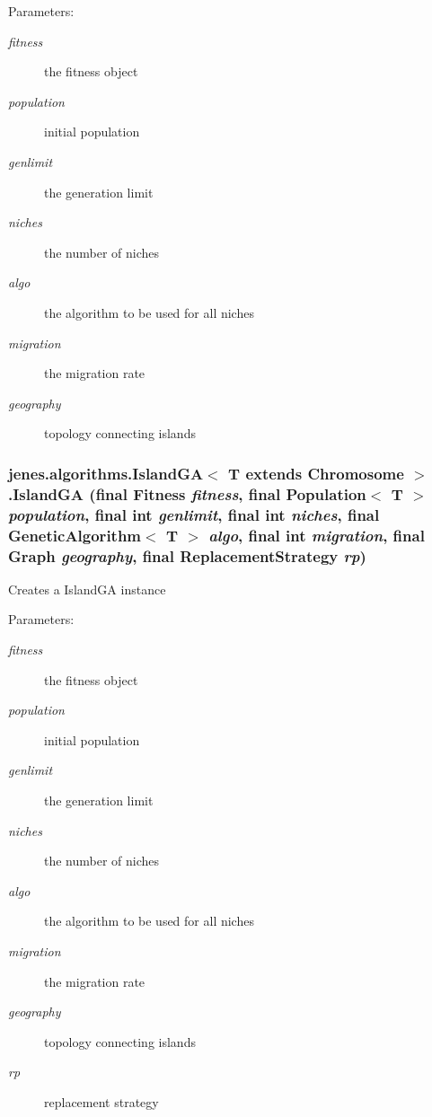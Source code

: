 \begin{Desc}
\item[Parameters:]
\begin{description}
\item[{\em fitness}]the fitness object \item[{\em population}]initial population \item[{\em genlimit}]the generation limit \item[{\em niches}]the number of niches \item[{\em algo}]the algorithm to be used for all niches \item[{\em migration}]the migration rate \item[{\em geography}]topology connecting islands \end{description}
\end{Desc}
\hypertarget{classjenes_1_1algorithms_1_1_island_g_a_3_01_t_01extends_01_chromosome_01_4_84cea4b1aab39f58e8c98f66592cdc17}{
\subsubsection[IslandGA]{\setlength{\rightskip}{0pt plus 5cm}jenes.algorithms.IslandGA$<$ T extends Chromosome $>$.IslandGA (final Fitness {\em fitness}, \/  final Population$<$ T $>$ {\em population}, \/  final int {\em genlimit}, \/  final int {\em niches}, \/  final GeneticAlgorithm$<$ T $>$ {\em algo}, \/  final int {\em migration}, \/  final Graph {\em geography}, \/  final {\bf ReplacementStrategy} {\em rp})}}
\label{classjenes_1_1algorithms_1_1_island_g_a_3_01_t_01extends_01_chromosome_01_4_84cea4b1aab39f58e8c98f66592cdc17}


Creates a IslandGA instance

\begin{Desc}
\item[Parameters:]
\begin{description}
\item[{\em fitness}]the fitness object \item[{\em population}]initial population \item[{\em genlimit}]the generation limit \item[{\em niches}]the number of niches \item[{\em algo}]the algorithm to be used for all niches \item[{\em migration}]the migration rate \item[{\em geography}]topology connecting islands \item[{\em rp}]replacement strategy \end{description}
\end{Desc}


